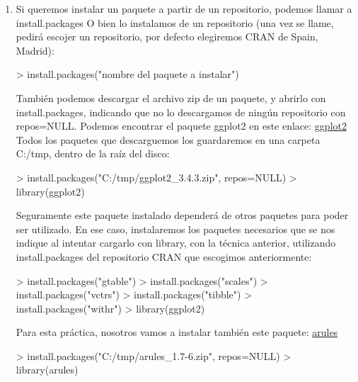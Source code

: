 \documentclass[parskip=full]{scrartcl}
\begin{document}
\begin{enumerate}
\item 
Si queremos instalar un paquete a partir de un repositorio, podemos llamar a install.packages
O bien lo instalamos de un repositorio (una vez se llame, pedirá escojer un repositorio, por defecto
elegiremos CRAN de Spain, Madrid):

\begin{Schunk}
\begin{Sinput}
> install.packages("nombre del paquete a instalar")
\end{Sinput}
\end{Schunk}

También podemos descargar el archivo zip de un paquete, y abrirlo con install.packages, indicando que no lo descargamos de ningún repositorio con repos=NULL. Podemos encontrar el paquete ggplot2 en este enlace: \href{https://cran.r-project.org/web/packages/ggplot2/index.html}{ggplot2}
Todos los paquetes que descarguemos los guardaremos en una carpeta C:/tmp, dentro de la raíz del disco:

\begin{Schunk}
\begin{Sinput}
> install.packages("C:/tmp/ggplot2_3.4.3.zip", repos=NULL)
> library(ggplot2)
\end{Sinput}
\end{Schunk}

Seguramente este paquete instalado dependerá de otros paquetes para poder ser utilizado. En ese caso, instalaremos
los paquetes necesarios que se nos indique al intentar cargarlo con library, con la técnica anterior, utilizando install.packages del repositorio CRAN que escogimos anteriormente:

\begin{Schunk}
\begin{Sinput}
> install.packages("gtable")
> install.packages("scales")
> install.packages("vctrs")
> install.packages("tibble")
> install.packages("withr")
> library(ggplot2)
\end{Sinput}
\end{Schunk}

Para esta práctica, nosotros vamos a instalar también este paquete: \href{https://cran.r-project.org/web/packages/arules/index.html}{arules}

\begin{Schunk}
\begin{Sinput}
> install.packages("C:/tmp/arules_1.7-6.zip", repos=NULL)
> library(arules)
\end{Sinput}
\end{Schunk}


\end{enumerate}
\end{document}
